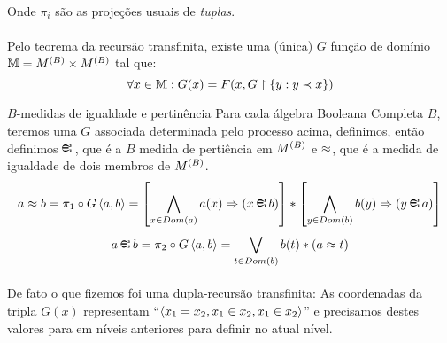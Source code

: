     \paragraph{}
        Onde $\pi_i$ são as projeções usuais de \textit{tuplas}.
    \paragraph{}
        Pelo teorema da recursão transfinita, existe uma (única) $G$ função de domínio $\mathbb{M}=M^{(B)}\times M^{(B)}$ 
        tal que:
    $$\forall x\in\mathbb{M}:G(x) = F(x,G\restriction\SET{y: y \prec x})$$
    \begin{definition}{$B$-medidas de igualdade e pertinência}
        Para cada álgebra Booleana Completa $B$, teremos uma $G$ associada determinada pelo processo acima, definimos,
        então definimos $\Min{}$, que é a $B$ medida de pertiência em $M^{(B)}$ e $\approx$, que é a medida de igualdade de 
        dois membros de $M^{(B)}$.
        $$ a \Meq b = \pi_1 \circ G\TUPLE{a}{b} = \left[\bigwedge_{x\in Dom(a)}a(x)\RAR (x\Min b)\right]*\left[\bigwedge_{y\in Dom(b)}b(y)\RAR (y\Min a)\right]$$
        $$ a \Min b = \pi_2 \circ G\TUPLE{a}{b} = \bigvee_{t\in Dom(b)} b(t)*(a\approx t)$$
    \end{definition}
    \paragraph{}
        De fato o que fizemos foi uma dupla-recursão transfinita: As coordenadas da tripla $G(x)$ representam 
        ``$\TUPLE{x_1 = x_2}{x_1 \in x_2}{x_1 \in x_2}$'' e precisamos destes valores para em níveis anteriores 
        para definir no atual nível.
